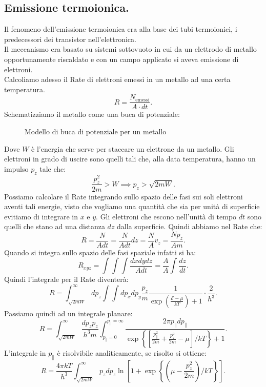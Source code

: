 \subsection{Emissione termoionica.}%
Il fenomeno dell'emissione termoionica era alla base dei tubi termoionici, i predecessori dei transistor nell'elettronica. \\
Il meccanismo era basato su sistemi sottovuoto in cui da un elettrodo di metallo opportunamente riscaldato e con un campo applicato si aveva emissione di elettroni.\\
Calcoliamo adesso il Rate di elettroni emessi in un metallo ad una certa temperatura.
\[
	R = \frac{N_{\text{emessi}}}{A\cdot dt}
.\] 
Schematizziamo il metallo come una buca di potenziale:
\begin{figure}[H]
    \centering
    \caption{\scriptsize Modello di buca di potenziale per un metallo}
    \label{fig:modello-di-buca-di-potenziale-per-un-metallo}
\end{figure}
\noindent 
Dove $W$ è l'energia che serve per staccare un elettrone da un metallo. Gli elettroni in grado di uscire sono quelli tali che, alla data temperatura, hanno un impulso $p_{z}$ tale che:
\[
	\frac{p_{z}^2}{2m} > W \implies p_{z} > \sqrt{2mW} 
.\] 
Possiamo calcolare il Rate integrando sullo spazio delle fasi sui soli elettroni aventi tali energie, visto che vogliamo una quantità che sia per unità di superficie evitiamo di integrare in $x$ e $y$. Gli elettroni che escono nell'unità di tempo $dt$ sono quelli che stano ad una distanza $dz$ dalla superficie. Quindi abbiamo nel Rate che:
\[
	R = \frac{N}{Adt} = \frac{N}{Adt}dz = \frac{N}{A}v_{z}= \frac{Np_{z}}{Am} 
.\] 
Quando si integra sullo spazio delle fasi spaziale infatti si ha:
\[
	R_{xyz} = \int\int\int \frac{dxdydz}{Adt} = \frac{A}{A}\int \frac{dz}{dt}
.\] 
Quindi l'integrale per il Rate diventerà:
\[
	R = \int_{\sqrt{2mW}}^{\infty}dp_{z} \int\int dp_{x}dp_{y} \frac{p_{z}}{m} \frac{1}{\exp\left( \frac{\mathcal{E} -\mu }{kT} \right) +1} \cdot \frac{2}{h^3} 
.\] 
Passiamo quindi ad un integrale planare:
\[
	R = \int_{\sqrt{2mW} }^{\infty} \frac{dp_{z}p_{z}}{h^3m}\int_{p_{\parallel}=0}^{p_{\parallel} = \infty} \frac{2\pi p_{\parallel} dp_{\parallel}}{\exp\left\{ \left[ \frac{p_{\parallel}^2}{2m} + \frac{p_{z}^2}{2m} -\mu  \right]/kT \right\} + 1} 
.\] 
L'integrale in $p_{\parallel}$ è risolvibile analiticamente, se risolto si ottiene:
\[
	R = \frac{4\pi kT}{h^3}\int_{\sqrt{2mW} }^{\infty} p_{z} dp_{z} \ln\left[ 1+\exp\left\{ \left( \mu - \frac{p_{z}^2}{2m} \right)/kT \right\}  \right]  
.\] 
